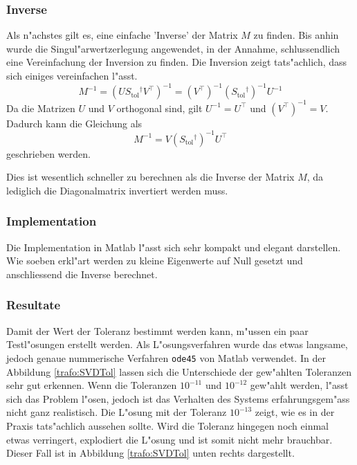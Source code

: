 \begin{refsection}
\subsubsection{Inverse}
Als n"achstes gilt es, eine einfache 'Inverse' der Matrix $M$ zu finden. Bis anhin wurde die Singul"arwertzerlegung angewendet, in der Annahme, schlussendlich eine Vereinfachung der Inversion zu finden. Die Inversion zeigt tats"achlich, dass sich einiges vereinfachen l"asst. \cite{trafo:Watkins}
\begin{equation*}
	M^{-1} = \left(U S{_\text{tol}}^\dagger V^\top\right)^{-1} = \left(V^\top\right)^{-1} \left(S{_\text{tol}}^\dagger\right)^{-1} U^{-1}
\end{equation*}
Da die Matrizen $U$ und $V$ orthogonal sind, gilt $U^{-1} = U^\top$ und $\left(V^\top\right)^{-1} = V$. Dadurch kann die Gleichung als 
\begin{equation*}
	M^{-1} = V \left(S{_\text{tol}}^\dagger \right)^{-1} U^\top
\end{equation*}
geschrieben werden.

Dies ist wesentlich schneller zu berechnen als die Inverse der Matrix $M$, da lediglich die Diagonalmatrix invertiert werden muss.

\subsubsection{Implementation \label{trafo:SVD}}
Die Implementation in Matlab l"asst sich sehr kompakt und elegant darstellen. Wie soeben erkl"art werden zu kleine Eigenwerte auf Null gesetzt und anschliessend die Inverse berechnet. 

{\scriptsize }

\subsubsection{Resultate}
Damit der Wert der Toleranz bestimmt werden kann, m"ussen ein paar Testl"osungen erstellt werden. Als L"osungsverfahren wurde das etwas langsame, jedoch genaue nummerische Verfahren \texttt{ode45} von Matlab verwendet. In der Abbildung \ref{trafo:SVDTol} lassen sich die Unterschiede der gew"ahlten Toleranzen sehr gut erkennen. Wenn die Toleranzen $10^{-11}$ und $10^{-12}$ gew"ahlt werden, l"asst sich das Problem l"osen, jedoch ist das Verhalten des Systems erfahrungsgem"ass nicht ganz realistisch. Die L"osung mit der Toleranz $10^{-13}$ zeigt, wie es in der Praxis tats"achlich aussehen sollte. Wird die Toleranz hingegen noch einmal etwas verringert, explodiert die L"osung und ist somit nicht mehr brauchbar. Dieser Fall ist in Abbildung \ref{trafo:SVDTol} unten rechts dargestellt.


\end{refsection}
